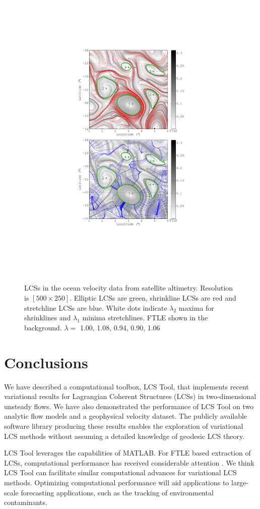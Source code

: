 \documentclass[5p]{elsarticle}
\begin{document}
\begin{figure}
\begin{center}
\includegraphics[width=.475\textwidth]{graphics/ocean_dataset/lambda_hyperbolic_lcs}
\end{center}
\caption{
LCSs in the ocean velocity data from satellite altimetry.
Resolution is $[500\times250]$.
Elliptic LCSs are green, shrinkline LCSs are red and stretchline LCSs are blue. 
White dots indicate $\lambda_2$ maxima for shrinklines and $\lambda_1$ minima stretchlines.
FTLE shown in the background.
$\lambda=$ 1.00, 1.08, 0.94, 0.90, 1.06
}
\label{f:ocean dataset LCS}
\end{figure}

\section{Conclusions}

We have described a computational toolbox, LCS Tool, that implements recent variational results for Lagrangian Coherent Structures (LCSs) in two-dimensional unsteady flows. We have also demonstrated the performance of LCS Tool on two analytic flow models and a geophysical velocity dataset. The publicly available software library producing these results enables the exploration of variational LCS methods without assuming a detailed knowledge of geodesic LCS theory.

LCS Tool leverages the capabilities of MATLAB. For FTLE based extraction of LCSs, computational performance has received considerable attention \citep{conti12:_gpu_apu_finit_time_lyapun_expon,miron12:_anisot_lagran_coher_struc}.
We think LCS Tool can facilitate similar computational advances for variational LCS methods.
Optimizing computational performance will aid applications to large-scale forecasting applications, such as the tracking of environmental contaminants\citep{olascoaga12:_forec}.
\end{document}
